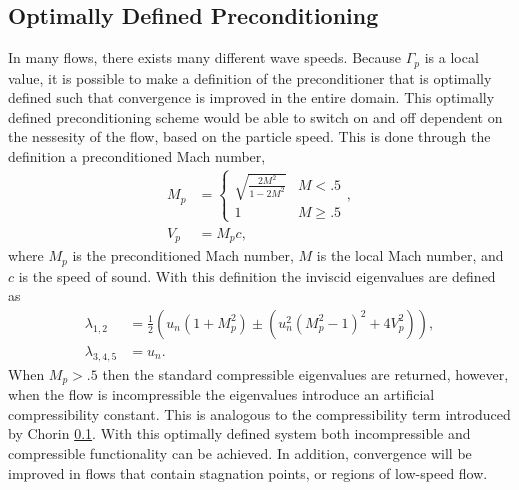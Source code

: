 \documentclass[draft]{aiaa-pretty}
\begin{document}
\subsection{Optimally Defined Preconditioning}
In many flows, there exists many different wave speeds.  Because $\Gamma_p$ is a local value, it is possible to make a definition of the preconditioner that is optimally defined
such that convergence is improved in the entire domain.  This optimally defined preconditioning scheme would be able to switch on and off dependent on the nessesity of the flow, based
on the particle speed.
This is done through the definition a preconditioned Mach number,
\begin{equation}
\begin{aligned}
 M_p &= \begin{cases} 
      \sqrt{\frac{2M^2}{1-2M^2}} & M<.5\\
      1 & M \geq .5 
   \end{cases},\\
 V_p &= M_pc,
\end{aligned}
\end{equation}
where $M_p$ is the preconditioned Mach number, $M$ is the local Mach number, and $c$ is the speed of sound.  With this definition the inviscid eigenvalues are defined as
\begin{equation}
\begin{aligned}
\label{eigenvalues}
 \lambda_{1,2}&=\frac{1}{2}\left(u_n\left(1+M_p^2\right)\pm\left(u_n^2\left(M_p^2-1\right)^2+4V_p^2\right)\right),\\
 \lambda_{3,4,5}&=u_n.
\end{aligned}
\end{equation}
When $M_p>.5$ then the standard compressible eigenvalues are returned, however, when the flow is incompressible the eigenvalues introduce an artificial compressibility constant.  
This is analogous to the compressibility term introduced by Chorin \ref{}.  With this optimally defined system both incompressible and compressible functionality can be achieved.  
In addition, convergence will be improved in flows that contain stagnation points, or regions of low-speed flow.

\end{document}
